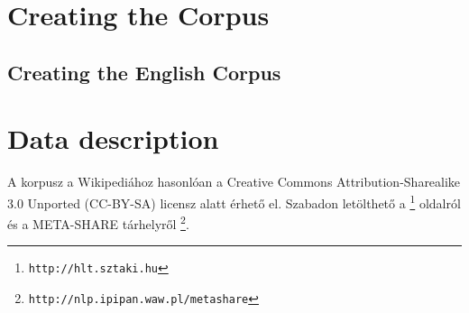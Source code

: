 \documentclass{llncs}
\begin{document}



\section{Creating the Corpus}
\subsection{Creating the English Corpus}

\section{Data description}

A korpusz a Wikipediához hasonlóan a Creative Commons Attribution-Sharealike
3.0 Unported (CC-BY-SA) licensz alatt érhető el. Szabadon letölthető a
\footnote{\texttt{http://hlt.sztaki.hu}} oldalról és a META-SHARE tárhelyről
\footnote{\texttt{http://nlp.ipipan.waw.pl/metashare}}.
\end{document}
